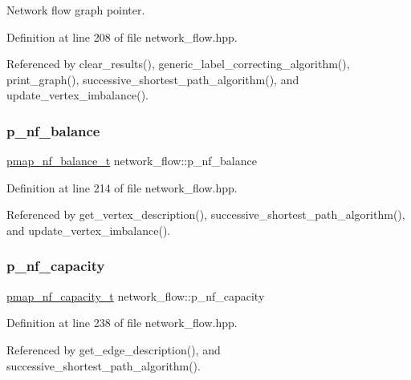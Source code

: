 Network flow graph pointer. 



Definition at line 208 of file network\+\_\+flow.\+hpp.



Referenced by clear\+\_\+results(), generic\+\_\+label\+\_\+correcting\+\_\+algorithm(), print\+\_\+graph(), successive\+\_\+shortest\+\_\+path\+\_\+algorithm(), and update\+\_\+vertex\+\_\+imbalance().

\mbox{\label{classnetwork__flow_a71c741226f50fdb317a03df0d13c99a1}} 
\subsubsection{\texorpdfstring{p\+\_\+nf\+\_\+balance}{p\_nf\_balance}}
{\footnotesize\ttfamily \hyperlink{classnetwork__flow_adb6c2e7def8309b3a5f660dd40a758e8}{pmap\+\_\+nf\+\_\+balance\+\_\+t} network\+\_\+flow\+::p\+\_\+nf\+\_\+balance}



Definition at line 214 of file network\+\_\+flow.\+hpp.



Referenced by get\+\_\+vertex\+\_\+description(), successive\+\_\+shortest\+\_\+path\+\_\+algorithm(), and update\+\_\+vertex\+\_\+imbalance().

\mbox{\label{classnetwork__flow_a686fe21b72f5bbe7e19c7797ef81a1bb}} 
\subsubsection{\texorpdfstring{p\+\_\+nf\+\_\+capacity}{p\_nf\_capacity}}
{\footnotesize\ttfamily \hyperlink{classnetwork__flow_a234594983ab43e779b43424c829cdcca}{pmap\+\_\+nf\+\_\+capacity\+\_\+t} network\+\_\+flow\+::p\+\_\+nf\+\_\+capacity}



Definition at line 238 of file network\+\_\+flow.\+hpp.



Referenced by get\+\_\+edge\+\_\+description(), and successive\+\_\+shortest\+\_\+path\+\_\+algorithm().

